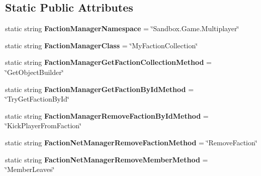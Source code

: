 \subsection*{Static Public Attributes}
\begin{DoxyCompactItemize}
\item 
\hypertarget{class_s_e_mod_a_p_i_internal_1_1_a_p_i_1_1_common_1_1_factions_manager_acf5757252622a8bee24534377bf54501}{}static string {\bfseries Faction\+Manager\+Namespace} = \char`\"{}Sandbox.\+Game.\+Multiplayer\char`\"{}\label{class_s_e_mod_a_p_i_internal_1_1_a_p_i_1_1_common_1_1_factions_manager_acf5757252622a8bee24534377bf54501}

\item 
\hypertarget{class_s_e_mod_a_p_i_internal_1_1_a_p_i_1_1_common_1_1_factions_manager_a59ac74d1c119add5e4653418455cc251}{}static string {\bfseries Faction\+Manager\+Class} = \char`\"{}My\+Faction\+Collection\char`\"{}\label{class_s_e_mod_a_p_i_internal_1_1_a_p_i_1_1_common_1_1_factions_manager_a59ac74d1c119add5e4653418455cc251}

\item 
\hypertarget{class_s_e_mod_a_p_i_internal_1_1_a_p_i_1_1_common_1_1_factions_manager_a1ca9518ecd53a0373d3c967a336ef0c0}{}static string {\bfseries Faction\+Manager\+Get\+Faction\+Collection\+Method} = \char`\"{}Get\+Object\+Builder\char`\"{}\label{class_s_e_mod_a_p_i_internal_1_1_a_p_i_1_1_common_1_1_factions_manager_a1ca9518ecd53a0373d3c967a336ef0c0}

\item 
\hypertarget{class_s_e_mod_a_p_i_internal_1_1_a_p_i_1_1_common_1_1_factions_manager_a0d49948e7bc53b601dfd07331ae6e545}{}static string {\bfseries Faction\+Manager\+Get\+Faction\+By\+Id\+Method} = \char`\"{}Try\+Get\+Faction\+By\+Id\char`\"{}\label{class_s_e_mod_a_p_i_internal_1_1_a_p_i_1_1_common_1_1_factions_manager_a0d49948e7bc53b601dfd07331ae6e545}

\item 
\hypertarget{class_s_e_mod_a_p_i_internal_1_1_a_p_i_1_1_common_1_1_factions_manager_a134d21922f6b4c6e920b5b788aab23ee}{}static string {\bfseries Faction\+Manager\+Remove\+Faction\+By\+Id\+Method} = \char`\"{}Kick\+Player\+From\+Faction\char`\"{}\label{class_s_e_mod_a_p_i_internal_1_1_a_p_i_1_1_common_1_1_factions_manager_a134d21922f6b4c6e920b5b788aab23ee}

\item 
\hypertarget{class_s_e_mod_a_p_i_internal_1_1_a_p_i_1_1_common_1_1_factions_manager_a362e1de03dcf44dd16df9843d77c5050}{}static string {\bfseries Faction\+Net\+Manager\+Remove\+Faction\+Method} = \char`\"{}Remove\+Faction\char`\"{}\label{class_s_e_mod_a_p_i_internal_1_1_a_p_i_1_1_common_1_1_factions_manager_a362e1de03dcf44dd16df9843d77c5050}

\item 
\hypertarget{class_s_e_mod_a_p_i_internal_1_1_a_p_i_1_1_common_1_1_factions_manager_a00491da907108661ef26cb1788519687}{}static string {\bfseries Faction\+Net\+Manager\+Remove\+Member\+Method} = \char`\"{}Member\+Leaves\char`\"{}\label{class_s_e_mod_a_p_i_internal_1_1_a_p_i_1_1_common_1_1_factions_manager_a00491da907108661ef26cb1788519687}

\end{DoxyCompactItemize}
